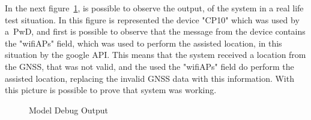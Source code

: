 In the next figure~\ref{fig:node_red_debug}, is possible to observe the output, of the system in a real life test situation. In this figure is represented the device "CP10" which was used by a~\gls{PwD}, and first is possible to observe that the message from the device contains the "wifiAPs" field, which was used to perform the assisted location, in this situation by the google API. This means that the system received a location from the GNSS, that was not valid, and the used the "wifiAPs" field do perform the assisted location, replacing the invalid GNSS data with this information. With this picture is possible to prove that system was working.
\begin{figure}[htbp]
  \centering
  \caption{Model Debug Output}
  \label{fig:node_red_debug}
\end{figure}



